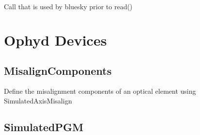 \documentclass[letterpaper,10pt,english]{sphinxmanual}
\begin{document}
\begin{fulllineitems}
\begin{fulllineitems}
\begin{quote}
\begin{description}
\end{description}\end{quote}

\end{fulllineitems}


\begin{fulllineitems}
\label{\detokenize{API:raypyng_bluesky.detector.RaypyngTriggerDetector.trigger}}
\pysigstartsignatures
{}
\pysigstopsignatures
\sphinxAtStartPar
Call that is used by bluesky prior to read()

\end{fulllineitems}


\end{fulllineitems}



\section{Ophyd Devices}
\label{\detokenize{API:ophyd-devices}}

\subsection{MisalignComponents}
\label{\detokenize{API:misaligncomponents}}

\begin{fulllineitems}
\label{\detokenize{API:raypyng_bluesky.devices.MisalignComponents}}
\pysigstartsignatures
{}
\pysigstopsignatures
\sphinxAtStartPar
Define the misalignment components of an optical element
using SimulatedAxisMisalign

\end{fulllineitems}



\subsection{SimulatedPGM}
\label{\detokenize{API:simulatedpgm}}
\end{document}
